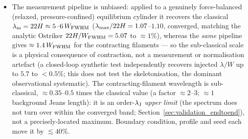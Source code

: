 \documentclass[usenatbib,twoside,twocolumn]{mnras}
\begin{document}
\begin{itemize}
\begin{itemize}
        \item The measurement pipeline is unbiased: applied to a genuinely force-balanced (relaxed, pressure-confined) equilibrium cylinder it recovers the classical $\lambda_{\rm m}=22H\approx5$--$6\,W_{\rm FWHM}$ ($\lambda_{\rm max}/22H=1.07$--$1.10$, converged, matching the analytic Ostriker $22H/W_{\rm FWHM}=5.07$ to $\approx1\%$), whereas the \emph{same} pipeline gives $\approx1.4\,W_{\rm FWHM}$ for the contracting filaments --- so the sub-classical scale is a physical consequence of contraction, not a measurement or normalisation artefact (a closed-loop synthetic test independently recovers injected $\lambda/W$ up to $5.7$ to $<0.5\%$; this does not test the skeletonisation, the dominant observational systematic). The contracting-filament wavelength is sub-classical, $\approx0.35$--$0.5$ times the classical value (a factor $\approx2$--$3$; $\approx1$ background Jeans length): it is an order-$\lambda_{\rm J}$ \emph{upper limit} (the spectrum does not turn over within the converged band; Section~\ref{sec:validation_endtoend}), not a precisely-located maximum. Boundary condition, profile and seed each move it by $\lesssim40\%$.

\end{itemize}
\end{itemize}
\end{document}
